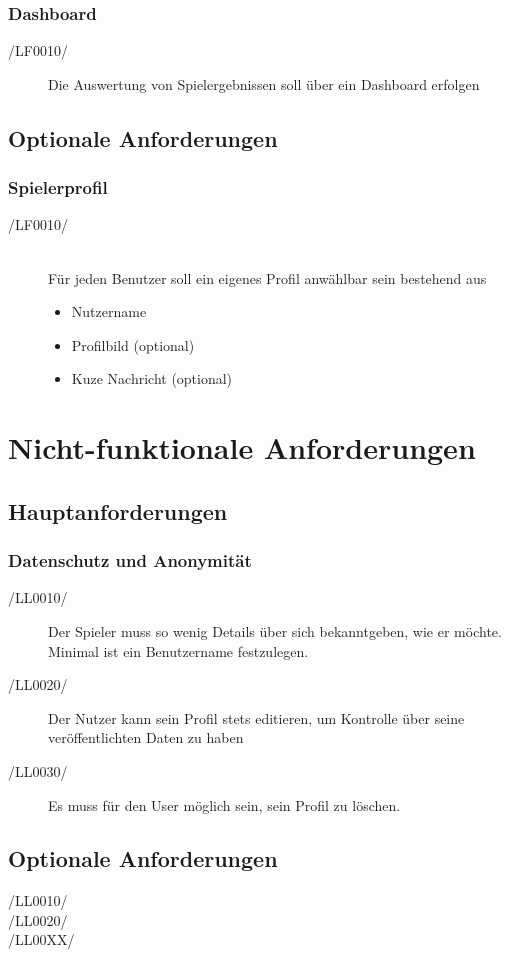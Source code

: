 \documentclass[11pt,a4paper]{scrreprt}
\begin{document}
\subsection{Dashboard}
\begin{description}
\item[/LF0010/] Die Auswertung von Spielergebnissen soll über ein Dashboard erfolgen
\end{description}
\section{Optionale Anforderungen}
\subsection{Spielerprofil}
\begin{description}
\item[/LF0010/] \ \\ 
Für jeden Benutzer soll ein eigenes Profil anwählbar sein bestehend aus
	\begin{itemize}
	\item Nutzername
	\item Profilbild (optional)
	\item Kuze Nachricht (optional)
	\end{itemize}
\end{description}
\chapter{Nicht-funktionale Anforderungen}
\section{Hauptanforderungen}
\subsection{Datenschutz und Anonymität}
\begin{description}
\item[/LL0010/] Der Spieler muss so wenig Details über sich bekanntgeben, wie er möchte. Minimal ist ein Benutzername festzulegen.
\item[/LL0020/] Der Nutzer kann sein Profil stets editieren, um Kontrolle über seine veröffentlichten Daten zu haben
\item[/LL0030/] Es muss für den User möglich sein, sein Profil zu löschen.
\end{description}
\section{Optionale Anforderungen}
\begin{description}
\item[/LL0010/]
\item[/LL0020/]
\item[/LL00XX/]
\end{description}
\end{document}

